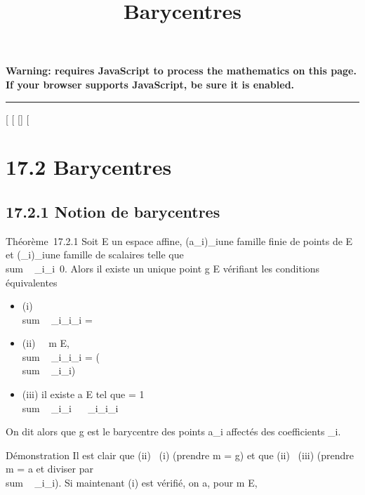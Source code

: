 \documentclass[]{article}
\title{Barycentres}
\author{}
\date{}
\begin{document}
\maketitle

\textbf{Warning: 
requires JavaScript to process the mathematics on this page.\\ If your
browser supports JavaScript, be sure it is enabled.}

\begin{center}\rule{3in}{0.4pt}\end{center}

[
[
[]
[

\section{17.2 Barycentres}

\subsection{17.2.1 Notion de barycentres}

Théorème~17.2.1 Soit E un espace affine, (a_i)_i\inI une
famille finie de points de E et (\lambda_i)_i\inI une famille
de scalaires telle que
\\sum ~
_i\inI\lambda_i\neq~0. Alors il existe un
unique point g \in E vérifiant les conditions équivalentes

\begin{itemize}
\itemsep1pt\parskip0pt
\item
  (i) \\sum ~
  _i\inI\lambda_i\overrightarrowga_i
  =
\item
  (ii) \forall~~m \in E,
  \\sum ~
  _i\inI\lambda_i\overrightarrowma_i
  = (\\sum ~
  _i\inI\lambda_i)\overrightarrowmg
\item
  (iii) il existe a \in E tel que \overrightarrowag =
  1 \over
  \\sum ~
  _i\inI\lambda_i \
  \sum ~
  _i\inI\lambda_i\overrightarrowaa_i
\end{itemize}

On dit alors que g est le barycentre des points a_i affectés
des coefficients \lambda_i.

Démonstration Il est clair que (ii) \rigtharrow~(i) (prendre m = g) et que (ii)
\rigtharrow~(iii) (prendre m = a et diviser par
\\sum ~
_i\inI\lambda_i). Si maintenant (i) est vérifié, on a, pour m \in
E,
\end{document}
